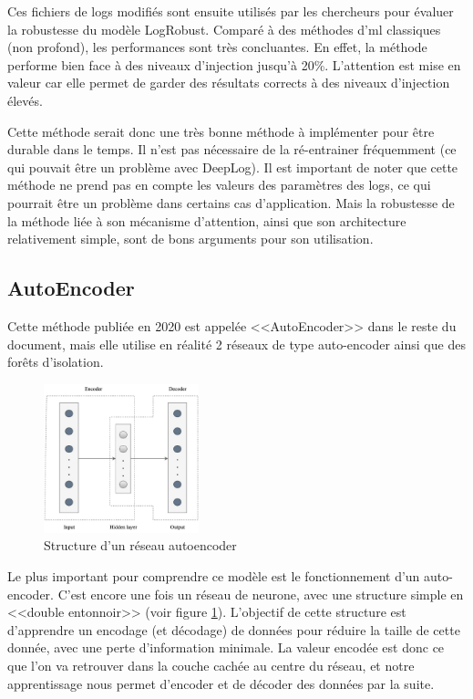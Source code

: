 \documentclass[openany, 11pt]{memoir}
\begin{document}
Ces fichiers de \glspl{log} modifiés sont ensuite utilisés par les chercheurs pour évaluer la robustesse du modèle LogRobust. Comparé à des méthodes d'\gls{ml} classiques (non profond), les performances sont très concluantes. En effet, la méthode performe bien face à des niveaux d'injection jusqu'à 20\%. L'attention est mise en valeur car elle permet de garder des résultats corrects à des niveaux d'injection élevés.

\bigskip
Cette méthode serait donc une très bonne méthode à implémenter pour être durable dans le temps. Il n'est pas nécessaire de la ré-entrainer fréquemment (ce qui pouvait être un problème avec DeepLog). Il est important de noter que cette méthode ne prend pas en compte les valeurs des paramètres des \glspl{log}, ce qui pourrait être un problème dans certains cas d'application. Mais la robustesse de la méthode liée à son mécanisme d'attention, ainsi que son architecture relativement simple, sont de bons arguments pour son utilisation.

\subsection{AutoEncoder}

Cette méthode publiée en 2020 \cite{autoencoder} est appelée <<AutoEncoder>> dans le reste du document, mais elle utilise en réalité 2 réseaux de type auto-encoder ainsi que des forêts d'isolation.

\begin{figure}[ht]
	\centering
	\includegraphics[width=0.4\textwidth]{images/autoencoder.png}
	\caption{Structure d'un réseau autoencoder}
	\label{autoencoder}
\end{figure}

\bigskip
Le plus important pour comprendre ce modèle est le fonctionnement d'un auto-encoder. C'est encore une fois un réseau de neurone, avec une structure simple en <<double entonnoir>> (voir figure \ref{autoencoder}). L'objectif de cette structure est d'apprendre un encodage (et décodage) de données pour réduire la taille de cette donnée, avec une perte d'information minimale. La valeur encodée est donc ce que l'on va retrouver dans la couche cachée au centre du réseau, et notre apprentissage nous permet d'encoder et de décoder des données par la suite.
\end{document}
